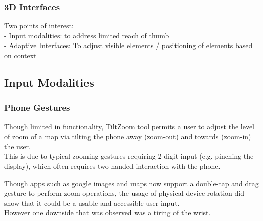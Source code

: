 \subsubsection{3D Interfaces} %






Two points of interest:\\
- Input modalities: to address limited reach of thumb\\
- Adaptive Interfaces: To adjust visible elements / positioning of elements based on context\\



\subsection{Input Modalities}
\subsubsection{Phone Gestures}
Though limited in functionality,  TiltZoom tool permits a user to adjust the level of zoom of a map via tilting the phone away (zoom-out) and towards (zoom-in) the user.\\
This is due to typical zooming gestures requiring 2 digit input (e.g. pinching the display), which often requires two-handed interaction with the phone.

Though apps such as google images and maps now support a double-tap and drag gesture to perform zoom operations, the usage of physical device rotation did show that it could be a usable and accessible user input.\\
However one downside that was observed was a tiring of the wrist.

